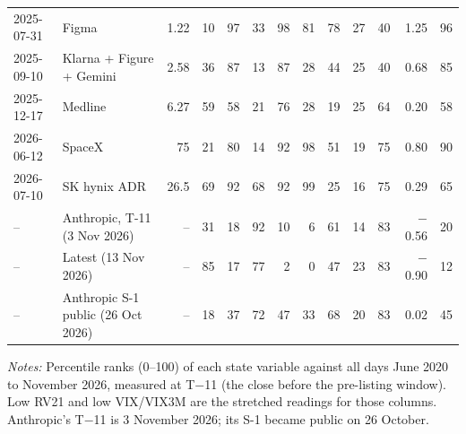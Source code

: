 \begin{table}[!htbp]
{\begin{threeparttable}
\begin{tabular}{llrrrrrrrrrrr}
2025-07-31 & Figma & 1.22 & 10 & 97 & 33 & 98 & 81 & 78 & 27 & 40 & 1.25 & 96 \\
2025-09-10 & Klarna + Figure + Gemini & 2.58 & 36 & 87 & 13 & 87 & 28 & 44 & 25 & 40 & 0.68 & 85 \\
2025-12-17 & Medline & 6.27 & 59 & 58 & 21 & 76 & 28 & 19 & 25 & 64 & 0.20 & 58 \\
2026-06-12 & SpaceX & 75 & 21 & 80 & 14 & 92 & 98 & 51 & 19 & 75 & 0.80 & 90 \\
2026-07-10 & SK hynix ADR & 26.5 & 69 & 92 & 68 & 92 & 99 & 25 & 16 & 75 & 0.29 & 65 \\
\midrule
-- & Anthropic, T-11 (3 Nov 2026) & -- & 31 & 18 & 92 & 10 & 6 & 61 & 14 & 83 & $-$0.56 & 20 \\
-- & Latest (13 Nov 2026) & -- & 85 & 17 & 77 & 2 & 0 & 47 & 23 & 83 & $-$0.90 & 12 \\
-- & Anthropic S-1 public (26 Oct 2026) & -- & 18 & 37 & 72 & 47 & 33 & 68 & 20 & 83 & 0.02 & 45 \\
\bottomrule
\end{tabular}
\begin{tablenotes}[flushleft]\footnotesize
\item \textit{Notes:} Percentile ranks (0--100) of each state variable against all days June 2020 to November 2026, measured at T$-$11 (the close before the pre-listing window). Low RV21 and low VIX/VIX3M are the stretched readings for those columns. Anthropic's T$-$11 is 3 November 2026; its S-1 became public on 26 October.
\end{tablenotes}
\end{threeparttable}
}
\end{table}
